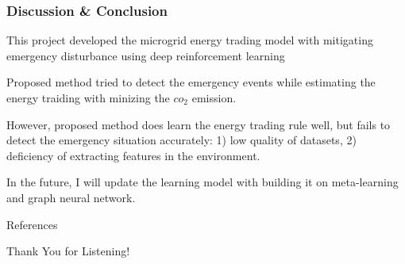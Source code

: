 \documentclass{beamer}
\begin{document}
\begin{frame}
\frametitle{Discussion \& Conclusion}
\bit
\item This project developed the microgrid energy trading model with mitigating emergency disturbance using deep reinforcement learning
\item Proposed method tried to detect the emergency events while estimating the energy traiding with minizing the $co_2$ emission. 
\item However, proposed method does learn the energy trading rule well, but fails to detect the emergency situation accurately: 1) low quality of datasets, 2) deficiency of extracting features in the environment. 
\item In the future, I will update the learning model with building it on meta-learning and graph neural network. 
\eit
\end{frame}

\begin{frame}[allowframebreaks]{References}
\nocite{*} %
\printbibliography
\end{frame}

\begin{frame}
    \centering
    \huge Thank You for Listening!
\end{frame}
\end{document}
